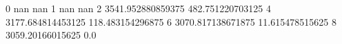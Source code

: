 0 nan nan
1 nan nan
2 3541.952880859375 482.751220703125
4 3177.684814453125 118.483154296875
6 3070.817138671875 11.615478515625
8 3059.20166015625 0.0
